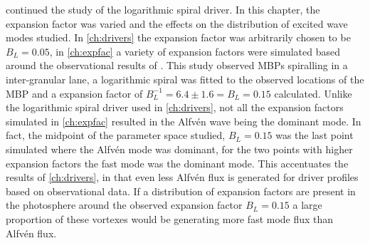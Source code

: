 \documentclass[a4paper,12pt,fourier,authoryear,custommargin]{Classes/PhDThesisPSnPDF}
\begin{document}
 continued the study of the logarithmic spiral driver.
In this chapter, the expansion factor was varied and the effects on the distribution of excited wave modes studied.
In \cref{ch:drivers} the expansion factor was arbitrarily chosen to be $B_L = 0.05$, in \cref{ch:expfac} a variety of expansion factors were simulated based around the observational results of \cite{bonet2008}.
This study observed MBPs spiralling in a inter-granular lane, a logarithmic spiral was fitted to the observed locations of the MBP and a expansion factor of $B_L^{-1} = 6.4 \pm 1.6 = B_L = 0.15$ calculated.
Unlike the logarithmic spiral driver used in \cref{ch:drivers}, not all the expansion factors simulated in \cref{ch:expfac} resulted in the Alfv\'en wave being the dominant mode.
In fact, the midpoint of the parameter space studied, $B_L = 0.15$ was the last point simulated where the Alfv\'en mode was dominant, for the two points with higher expansion factors the fast mode was the dominant mode.
This accentuates the results of \cref{ch:drivers}, in that even less Alfv\'en flux is generated for driver profiles based on observational data.
If a distribution of expansion factors are present in the photosphere around the observed expansion factor $B_L = 0.15$ a large proportion of these vortexes would be generating more fast mode flux than Alfv\'en flux.
\end{document}

